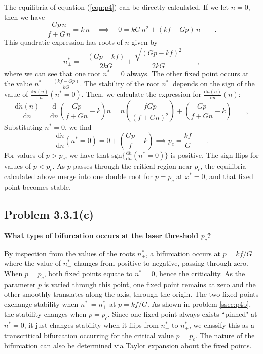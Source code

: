 \documentclass[draft]{agujournal2019}
\begin{document}
The equilibria of equation (\ref{eqn:p4}) can be directly calculated. If we let $\dot{n}=0$, then we have 
\begin{equation*}
    \frac{Gp\,n}{f + G\,n} = k\,n \quad \implies \quad 0 = k G \,n^2 + (kf - Gp)\,n \qquad .
\end{equation*}
This quadratic expression has roots of $n$ given by 
\begin{equation*}
    n^*_\pm = -\frac{(Gp - kf)}{2kG} \pm \frac{\sqrt{(Gp - kf)^2}}{2kG} \qquad ,
\end{equation*}
where we can see that one root $n^*_-=0$ always. The other fixed point occurs at the value $n^*_+ = \frac{(kf-Gp)}{kG}$. The stability of the root $n^*_-$ depends on the sign of the value of $\frac{\mathrm{d}\dot{n}(n)}{\mathrm{d}n}(n^*=0)$. Then, we calculate the expression for $\frac{\mathrm{d}\dot{n}(n)}{\mathrm{d}n}(n)$:
\begin{equation*}
    \frac{\mathrm{d}\dot{n}(n)}{\mathrm{d}n} = \frac{\mathrm{d}}{\mathrm{d}n} \left( \frac{Gp}{f+Gn} - k \right)n=  n\left( \frac{fGp}{(f+Gn)^2}\right) + \left( \frac{Gp}{f+Gn} - k \right) \qquad ,
\end{equation*}
Substituting $n^*=0$, we find
\begin{equation*}
    \frac{\mathrm{d}\dot{n}}{\mathrm{d}n}(n^*=0) = 0 +  \left( \frac{Gp}{f} - k \right) \implies p_c = \frac{kf}{G}\qquad .
\end{equation*}
For values of $p>p_c$, we have that $\mathrm{sgn}\{\frac{\mathrm{d}\dot{n}}{\mathrm{d}n}(n^*=0)\}$ is positive. The sign flips for values of $p<p_c$. As $p$ passes through the critical region near $p_c$, the equilibria calculated above merge into one double root for $p=p_c$ at $x^*=0$, and that fixed point becomes stable. 


\subsection{Problem 3.3.1(c)}
\label{ssec:p4c}

\textbf{What type of bifurcation occurs at the laser threshold $p_c$? }


By inspection from the values of the roots $n^*_\pm$, a bifurcation occurs at $p=kf/G$ where the value of $n^*_+$ changes from positive to negative, passing through zero. When $p=p_c$, both fixed points equate to $n^*=0$, hence the criticality. As the parameter $p$ is varied through this point, one fixed point remains at zero and the other smoothly translates along the axis, through the origin. The two fixed points exchange stability when $n^*_-=n^*_+$ at $p=kf/G$. As shown in problem \ref{ssec:p4b}, the stability changes when $p=p_c$. Since one fixed point always exists ``pinned" at $n^*=0$, it just changes stability when it flips from $n^*_-$ to $n^*_+$, we classify this as a transcritical bifurcation occurring for the critical value $p=p_c$. The nature of the bifurcation can also be determined via Taylor expansion about the fixed points. 
\end{document}
